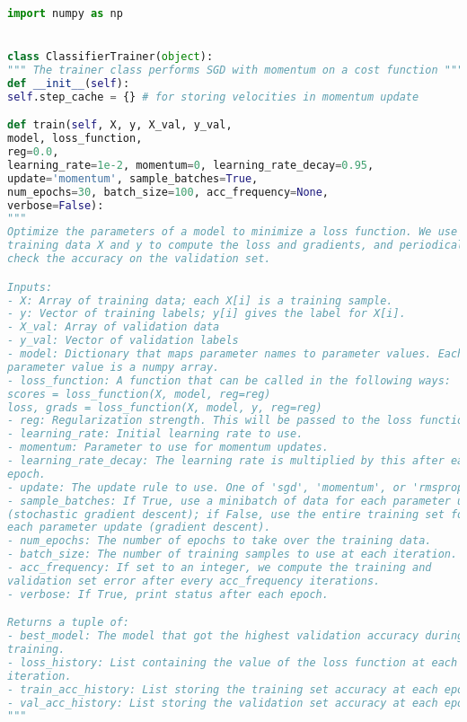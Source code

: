 \begin{lstlisting}[language=Python, label=lst:classifiertrainer.py, caption={classifier\_trainer.py}, basicstyle=\tiny]
import numpy as np


class ClassifierTrainer(object):
""" The trainer class performs SGD with momentum on a cost function """
def __init__(self):
self.step_cache = {} # for storing velocities in momentum update

def train(self, X, y, X_val, y_val, 
model, loss_function, 
reg=0.0,
learning_rate=1e-2, momentum=0, learning_rate_decay=0.95,
update='momentum', sample_batches=True,
num_epochs=30, batch_size=100, acc_frequency=None,
verbose=False):
"""
Optimize the parameters of a model to minimize a loss function. We use
training data X and y to compute the loss and gradients, and periodically
check the accuracy on the validation set.

Inputs:
- X: Array of training data; each X[i] is a training sample.
- y: Vector of training labels; y[i] gives the label for X[i].
- X_val: Array of validation data
- y_val: Vector of validation labels
- model: Dictionary that maps parameter names to parameter values. Each
parameter value is a numpy array.
- loss_function: A function that can be called in the following ways:
scores = loss_function(X, model, reg=reg)
loss, grads = loss_function(X, model, y, reg=reg)
- reg: Regularization strength. This will be passed to the loss function.
- learning_rate: Initial learning rate to use.
- momentum: Parameter to use for momentum updates.
- learning_rate_decay: The learning rate is multiplied by this after each
epoch.
- update: The update rule to use. One of 'sgd', 'momentum', or 'rmsprop'.
- sample_batches: If True, use a minibatch of data for each parameter update
(stochastic gradient descent); if False, use the entire training set for
each parameter update (gradient descent).
- num_epochs: The number of epochs to take over the training data.
- batch_size: The number of training samples to use at each iteration.
- acc_frequency: If set to an integer, we compute the training and
validation set error after every acc_frequency iterations.
- verbose: If True, print status after each epoch.

Returns a tuple of:
- best_model: The model that got the highest validation accuracy during
training.
- loss_history: List containing the value of the loss function at each
iteration.
- train_acc_history: List storing the training set accuracy at each epoch.
- val_acc_history: List storing the validation set accuracy at each epoch.
"""


\end{lstlisting}
